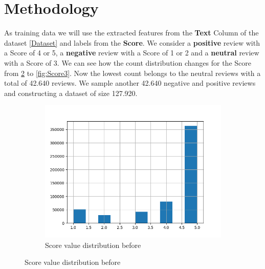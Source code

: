 \documentclass{article}
\begin{document}
\section{Methodology}
As training data we will use the extracted features from the \textbf{Text} Column of the 
dataset \ref{Dataset} and labels from the \textbf{Score}.
We consider a \textbf{positive} review with a Score of 4 or 5, 
a \textbf{negative} review with a Score of 1 or 2 and a \textbf{neutral} review
with a Score of 3. We can see how the count distribution changes for the Score
from \ref{fig:Score5} to \ref{fig:Score3}. Now the lowest count belongs to the neutral 
reviews with a total of 42.640 reviews. We sample another 42.640 negative and 
positive reviews and constructing a dataset of size 127.920. 

\begin{figure}[h!]
  \centering
  \begin{subfigure}[b]{0.4\linewidth}
    \includegraphics[width=\linewidth]{Score5.png}
    \caption{Score value distribution before}
    \label{fig:Score5}
  \end{subfigure}


\end{figure}
\end{document}
